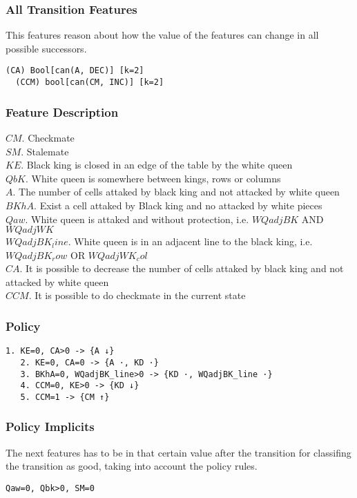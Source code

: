 \documentclass[a4paper]{article}
\begin{document}
\subsubsection{All Transition Features}
This features reason about how the value of the features can change in all possible successors.
\begin{Verbatim}[fontsize=\footnotesize]
  (CA) Bool[can(A, DEC)] [k=2]
  (CCM) bool[can(CM, INC)] [k=2]
\end{Verbatim}


\subsubsection{Feature Description}
$CM$. Checkmate\\
$SM$. Stalemate\\
$KE$. Black king is closed in an edge of the table by the white queen\\
$QbK$. White queen is somewhere between kings, rows or columns\\
$A$. The number of cells attaked by black king and not attacked by white queen\\
$BKhA$. Exist a cell attaked by Black king and no attacked by white pieces\\
$Qaw$. White queen is attaked and without protection, i.e. $WQadjBK$ AND $WQadjWK$\\
$WQadjBK_line$. White queen is in an adjacent line to the black king, i.e. $WQadjBK_row$ OR $WQadjWK_col$\\
$CA$. It is possible to decrease the number of cells attaked by black king and not attacked by white queen\\
$CCM$. It is possible to do checkmate in the current state


\subsubsection{Policy}
  \begin{Verbatim}[fontsize=\footnotesize]
   1. KE=0, CA>0 -> {A ↓}
   2. KE=0, CA=0 -> {A ·, KD ·}
   3. BKhA=0, WQadjBK_line>0 -> {KD ·, WQadjBK_line ·}
   4. CCM=0, KE>0 -> {KD ↓}
   5. CCM=1 -> {CM ↑}
  \end{Verbatim}


\subsubsection{Policy Implicits}
The next features has to be in that certain value after the transition for classifing the transition as good, taking into account the policy rules.
  \begin{Verbatim}[fontsize=\footnotesize]
   Qaw=0, Qbk>0, SM=0
  \end{Verbatim}
\end{document}
